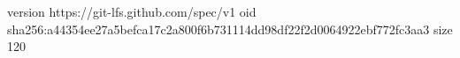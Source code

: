 version https://git-lfs.github.com/spec/v1
oid sha256:a44354ee27a5befca17c2a800f6b731114dd98df22f2d0064922ebf772fc3aa3
size 120
